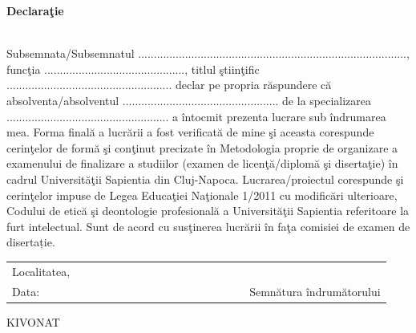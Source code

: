 \documentclass[12pt, a4paper, oneside]{book}
\theoremstyle{tetel}
\begin{document}
\newpage
\thispagestyle{empty}
\begin{center}
	\textbf{Declaraţie}
\end{center}
\leavevmode
\\[2cm]
\indent
Subsemnata/Subsemnatul ......................................................................................, funcţia .............................................,
titlul ştiinţific ..................................................... declar pe propria răspundere că absolventa/absolventul .................................................. de la specializarea .................................................... a întocmit prezenta lucrare sub îndrumarea mea.
\newline
\indent
Forma finală a lucrării a fost verificată de mine şi aceasta corespunde cerinţelor de formă şi conţinut precizate în Metodologia proprie de organizare a examenului de finalizare a studiilor (examen de licenţă/diplomă şi disertaţie) în cadrul Universităţii Sapientia din Cluj-Napoca. Lucrarea/proiectul corespunde şi cerinţelor impuse de Legea Educaţiei Naţionale 1/2011 cu modificări ulterioare, Codului de etică şi deontologie profesională a Universităţii Sapientia referitoare la furt intelectual.
Sunt de acord cu susţinerea lucrării în faţa comisiei de examen de disertație.
\newline
\\[7cm]
\indent
\begin{tabular}{lcccccccccccccccl}
	Localitatea,\\
	Data: &&&&&& &&&&&&&&&&Semnătura îndrumătorului\\
\end{tabular}


\newpage
\thispagestyle{empty}
\begin{center}
    \Large KIVONAT
\end{center}
\end{document}
